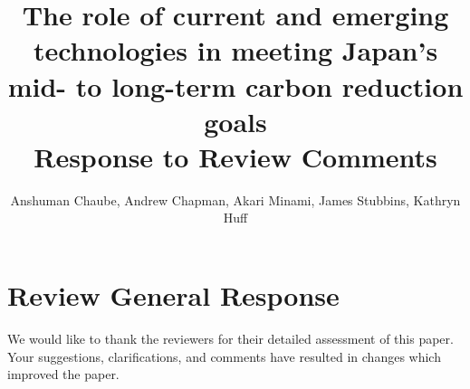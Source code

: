 \documentclass[answers,11pt]{exam}
\begin{document}


%

\title{The role of current and emerging technologies in meeting Japan's mid- to long-term carbon reduction goals\\
\large Response to Review Comments}
\author{Anshuman Chaube, Andrew Chapman, Akari Minami, James Stubbins, Kathryn Huff}



%
\maketitle
\section*{Review General Response}
We would like to thank the reviewers for their detailed assessment of
this paper. Your suggestions, clarifications, and comments have resulted in 
changes which improved the paper.
\end{document}
